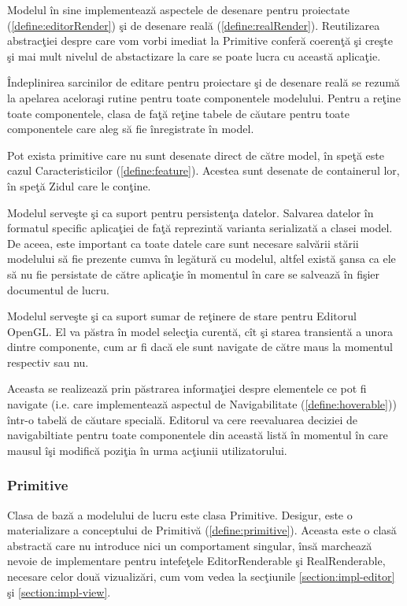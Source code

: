 Modelul în sine implementează aspectele de desenare pentru
proiectate (\ref{define:editorRender}) şi de desenare reală
(\ref{define:realRender}). Reutilizarea abstracţiei despre care vom vorbi
imediat la Primitive conferă coerenţă şi creşte şi mai mult nivelul de
abstactizare la care se poate lucra cu această aplicaţie.

Îndeplinirea sarcinilor de editare pentru proiectare şi de desenare reală se
rezumă la apelarea aceloraşi rutine pentru toate componentele modelului. Pentru
a reţine toate componentele, clasa de faţă reţine tabele de căutare pentru toate
componentele care aleg să fie înregistrate în model.

Pot exista primitive care nu sunt desenate direct de către model, în speţă este
cazul Caracteristicilor (\ref{define:feature}). Acestea sunt desenate de
containerul lor, în speţă Zidul care le conţine.

Modelul serveşte şi ca suport pentru persistenţa datelor. Salvarea datelor în 
formatul specific aplicaţiei de faţă reprezintă varianta serializată a clasei
model. De aceea, este important ca toate datele care sunt necesare salvării
stării modelului să fie prezente cumva în legătură cu modelul, altfel există
şansa ca ele să nu fie persistate de către aplicaţie în momentul în care se
salvează în fişier documentul de lucru.

Modelul serveşte şi ca suport sumar de reţinere de stare pentru Editorul OpenGL.
El va păstra în model selecţia curentă, cît şi starea transientă a unora dintre
componente, cum ar fi dacă ele sunt navigate de către maus la momentul respectiv
sau nu.

Aceasta se realizează prin păstrarea informaţiei despre elementele ce pot fi
navigate (i.e. care implementează aspectul de Navigabilitate
(\ref{define:hoverable})) într-o tabelă de căutare specială. Editorul va cere
reevaluarea deciziei de navigabiltiate pentru toate componentele din această
listă în momentul în care mausul îşi modifică poziţia în urma acţiunii
utilizatorului.

\subsubsection{Primitive}
Clasa de bază a modelului de lucru este clasa Primitive. Desigur, este o 
materializare a conceptului de Primitivă (\ref{define:primitive}). Aceasta este 
o clasă abstractă care nu introduce nici un comportament singular, însă 
marchează nevoie de implementare pentru intefeţele EditorRenderable şi 
RealRenderable, necesare celor două vizualizări, cum vom vedea la secţiunile 
\ref{section:impl-editor} şi \ref{section:impl-view}.

